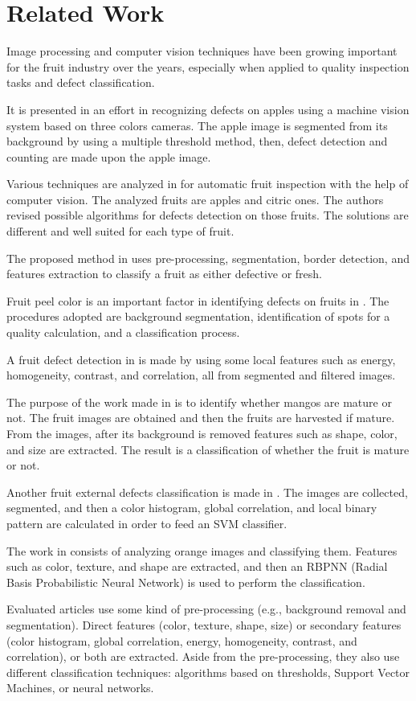 \documentclass[../main.tex]{subfile}
\begin{document}
\section{Related Work} \label{sec:related-work}
    Image processing and computer vision techniques have been growing important for the fruit industry over the years, especially when applied to quality inspection tasks and defect classification.
    
    It is presented in \cite{II-item1} an effort in recognizing defects on apples using a machine vision system based on three colors cameras. The apple image is segmented from its background by using a multiple threshold method, then, defect detection and counting are made upon the apple image.
    
    Various techniques are analyzed in \cite{II-item2} for automatic fruit inspection with the help of computer vision. The analyzed fruits are apples and citric ones. The authors revised possible algorithms for defects detection on those fruits. The solutions are different and well suited for each type of fruit.
    
    The proposed method in \cite{II-item3} uses pre-processing, segmentation, border detection, and features extraction to classify a fruit as either defective or fresh.
    
    Fruit peel color is an important factor in identifying defects on fruits in \cite{II-item4}. The procedures adopted are background segmentation, identification of spots for a quality calculation, and a classification process.
    
    A fruit defect detection in \cite{II-item5} is made by using some local features such as energy, homogeneity, contrast, and correlation, all from segmented and filtered images.
    
    The purpose of the work made in \cite{II-item6} is to identify whether mangos are mature or not. The fruit images are obtained and then the fruits are harvested if mature. From the images, after its background is removed features such as shape, color, and size are extracted. The result is a classification of whether the fruit is mature or not.
    
    Another fruit external defects classification is made in \cite{II-item7}. The images are collected, segmented, and then a color histogram, global correlation, and local binary pattern are calculated in order to feed an SVM classifier.
    
    The work in \cite{II-item8} consists of analyzing orange images and classifying them. Features such as color, texture, and shape are extracted, and then an RBPNN (Radial Basis Probabilistic Neural Network) is used to perform the classification.
    
    Evaluated articles use some kind of pre-processing (e.g., background removal and segmentation). Direct features (color, texture, shape, size) or secondary features (color histogram, global correlation, energy, homogeneity, contrast, and correlation), or both are extracted. Aside from the pre-processing, they also use different classification techniques: algorithms based on thresholds, Support Vector Machines, or neural networks.
\end{document}
